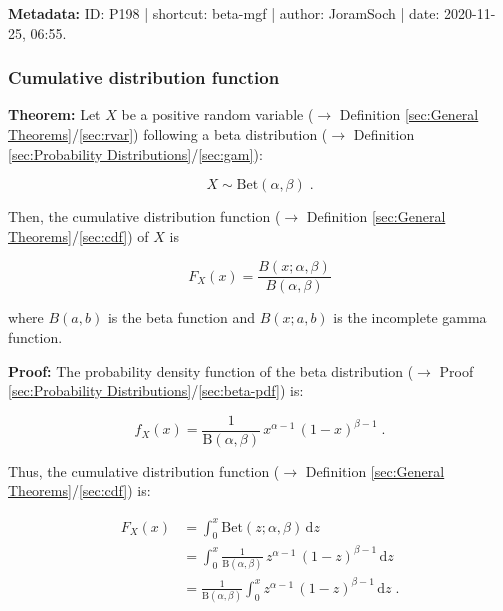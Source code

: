 \documentclass[a4paper,12pt,twoside]{book}
\begin{document}
\vspace{1em}
\textbf{Metadata:} ID: P198 | shortcut: beta-mgf | author: JoramSoch | date: 2020-11-25, 06:55.
\vspace{1em}



\subsubsection[\textbf{Cumulative distribution function}]{Cumulative distribution function} \label{sec:beta-cdf}
\setcounter{equation}{0}

\textbf{Theorem:} Let $X$ be a positive random variable ($\rightarrow$ Definition \ref{sec:General Theorems}/\ref{sec:rvar}) following a beta distribution ($\rightarrow$ Definition \ref{sec:Probability Distributions}/\ref{sec:gam}):

\begin{equation} \label{eq:beta-cdf-beta}
X \sim \mathrm{Bet}(\alpha, \beta) \; .
\end{equation}

Then, the cumulative distribution function ($\rightarrow$ Definition \ref{sec:General Theorems}/\ref{sec:cdf}) of $X$ is

\begin{equation} \label{eq:beta-cdf-beta-cdf}
F_X(x) = \frac{B(x; \alpha, \beta)}{B(\alpha, \beta)}
\end{equation}

where $B(a,b)$ is the beta function and $B(x;a,b)$ is the incomplete gamma function.


\vspace{1em}
\textbf{Proof:} The probability density function of the beta distribution ($\rightarrow$ Proof \ref{sec:Probability Distributions}/\ref{sec:beta-pdf}) is:

\begin{equation} \label{eq:beta-cdf-beta-pdf}
f_X(x) = \frac{1}{\mathrm{B}(\alpha, \beta)} \, x^{\alpha-1} \, (1-x)^{\beta-1} \; .
\end{equation}

Thus, the cumulative distribution function ($\rightarrow$ Definition \ref{sec:General Theorems}/\ref{sec:cdf}) is:

\begin{equation} \label{eq:beta-cdf-beta-cdf-app}
\begin{split}
F_X(x) &= \int_{0}^{x} \mathrm{Bet}(z; \alpha, \beta) \, \mathrm{d}z \\
&= \int_{0}^{x} \frac{1}{\mathrm{B}(\alpha, \beta)} \, z^{\alpha-1} \, (1-z)^{\beta-1} \, \mathrm{d}z \\
&= \frac{1}{\mathrm{B}(\alpha, \beta)} \int_{0}^{x} z^{\alpha-1} \, (1-z)^{\beta-1} \, \mathrm{d}z \; .
\end{split}
\end{equation}
\end{document}

